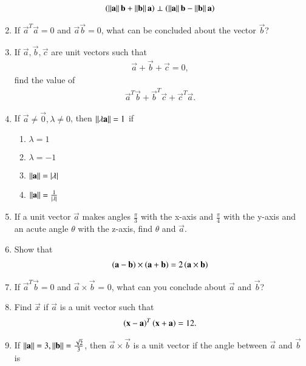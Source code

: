 \begin{enumerate}[label=\arabic*.,ref=\thesubsection.\theenumi]
\begin{align}
\left(\left\lVert\mathbf{a}\right\rVert\mathbf{b}+\left\lVert\mathbf{b}\right\rVert\mathbf{a}\right)\perp \left(\left\lVert\mathbf{a}\right\rVert\mathbf{b}-\left\lVert\mathbf{b}\right\rVert\mathbf{a}\right)
\end{align}
\item If $\vec{a}^T\vec{a}=0$ and  $\vec{a}\vec{b}=0$, what can be concluded about the vector $\vec{b}$?
\item If $\vec{a},\vec{b},\vec{c}$ are unit vectors such that 
\begin{align}
\vec{a}+\vec{b}+\vec{c} = 0,
\end{align}
find the value of 
\begin{align}
\vec{a}^T\vec{b}+\vec{b}^T\vec{c}+\vec{c}^T\vec{a}.
\end{align}
\item If $\vec{a} \ne \vec{0}, \lambda \ne 0$, then $\left\lVert\lambda \mathbf{a}\right\rVert = 1$ if
\begin{enumerate}
\item $\lambda =1$
\item $\lambda = -1$
\item $\left\lVert\mathbf{a}\right\rVert=\left\vert\lambda\right\vert$
\item $\left\lVert\mathbf{a}\right\rVert=\frac{1}{\left\vert\lambda\right\vert}$
\end{enumerate}
\item If a unit vector $\vec{a}$ makes angles $\frac{\pi}{3}$ with the x-axis and $\frac{\pi}{4}$ with the y-axis and an acute angle $\theta$ with the z-axis, find $\theta$ and $\vec{a}$.
\item Show that 
\begin{align}
\left(\mathbf{a}-\mathbf{b}\right)\times \left(\mathbf{a}+\mathbf{b}\right) = 2\left(\mathbf{a}\times\mathbf{b}\right)
\end{align}
\item If $\vec{a}^T\vec{b} = 0$ and $\vec{a}\times \vec{b}$ = 0, what can you conclude about $\vec{a}$ and $\vec{b}$?
\item Find $\vec{x}$ if  $\vec{a}$ is a unit vector such that
\begin{align}
\left(\mathbf{x}-\mathbf{a}\right)^T\left(\mathbf{x}+\mathbf{a}\right) = 12.
\end{align}
\item If $\left\lVert\mathbf{a}\right\rVert = 3, \left\lVert\mathbf{b}\right\rVert =\frac{\sqrt{2}}{3}$, then $\vec{a}\times \vec{b}$ is a unit vector if the angle between $\vec{a}$ and $\vec{b}$ is 
\begin{enumerate}[itemsep = 2pt]
\end{enumerate}
\end{enumerate}

